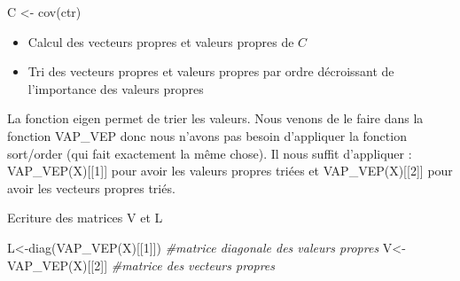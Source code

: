 \documentclass[
]{article}
\newenvironment{Shaded}{\begin{snugshade}}{\end{snugshade}}
\newcommand{\CommentTok}[1]{\textcolor[rgb]{0.56,0.35,0.01}{\textit{#1}}}
\newcommand{\ControlFlowTok}[1]{\textcolor[rgb]{0.13,0.29,0.53}{\textbf{#1}}}
\newcommand{\DecValTok}[1]{\textcolor[rgb]{0.00,0.00,0.81}{#1}}
\newcommand{\FunctionTok}[1]{\textcolor[rgb]{0.00,0.00,0.00}{#1}}
\newcommand{\NormalTok}[1]{#1}
\newcommand{\OtherTok}[1]{\textcolor[rgb]{0.56,0.35,0.01}{#1}}
\newcommand{\SpecialCharTok}[1]{\textcolor[rgb]{0.00,0.00,0.00}{#1}}
\providecommand{\tightlist}{%
  \setlength{\itemsep}{0pt}\setlength{\parskip}{0pt}}
\begin{document}
\begin{Shaded}
\begin{Highlighting}[]
\NormalTok{C }\OtherTok{\textless{}{-}} \FunctionTok{cov}\NormalTok{(ctr)}
\end{Highlighting}
\end{Shaded}

\begin{itemize}
\tightlist
\item
  Calcul des vecteurs propres et valeurs propres de \(C\)
\end{itemize}

\begin{Shaded}
\end{Shaded}

\begin{itemize}
\tightlist
\item
  Tri des vecteurs propres et valeurs propres par ordre décroissant de
  l'importance des valeurs propres
\end{itemize}

La fonction eigen permet de trier les valeurs. Nous venons de le faire
dans la fonction VAP\_VEP donc nous n'avons pas besoin d'appliquer la
fonction sort/order (qui fait exactement la même chose). Il nous suffit
d'appliquer : VAP\_VEP(X){[}{[}1{]}{]} pour avoir les valeurs propres
triées et VAP\_VEP(X){[}{[}2{]}{]} pour avoir les vecteurs propres
triés.

Ecriture des matrices V et L

\begin{Shaded}
\begin{Highlighting}[]
\NormalTok{L}\OtherTok{\textless{}{-}}\FunctionTok{diag}\NormalTok{(}\FunctionTok{VAP\_VEP}\NormalTok{(X)[[}\DecValTok{1}\NormalTok{]]) }\CommentTok{\#matrice diagonale des valeurs propres}
\NormalTok{V}\OtherTok{\textless{}{-}}\FunctionTok{VAP\_VEP}\NormalTok{(X)[[}\DecValTok{2}\NormalTok{]] }\CommentTok{\#matrice des vecteurs propres}
\end{Highlighting}
\end{Shaded}
\end{document}
